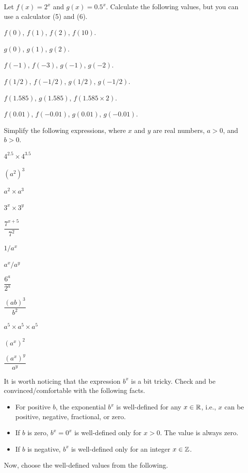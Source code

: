 \documentclass[11pt,pdfa,lastpage]{MishoNote}
\begin{document}
\begin{enumerate}
  \itemA Let $f(x)=2^x$ and $g(x)=0.5^x$.  Calculate the following values, but you can use a calculator  (5) and (6).
  \begin{menumerate}{2}
    \item $f(0)$, $f(1)$, $f(2)$, $f(10)$.
    \item $g(0)$, $g(1)$, $g(2)$.
    \item $f(-1)$, $f(-3)$, $g(-1)$, $g(-2)$.
    \item $f(1/2)$, $f(-1/2)$, $g(1/2)$, $g(-1/2)$.
    \item $f(1.585)$, $g(1.585)$, $f(1.585\times 2)$.
    \item $f(0.01)$, $f(-0.01)$, $g(0.01)$, $g(-0.01)$.
  \end{menumerate}
  \itemA Simplify the following expressions, where $x$ and $y$ are real numbers, $a>0$, and $b>0$.
  \begin{menumerate}{3}
    \item $4^{2.5}\times 4^{3.5}$
    \item $(a^2)^3$
    \item $a^2\times a^3$
    \item $3^{x}\times 3^{y}$
    \item $\dfrac{7^{x+5}}{7^{2}}$
    \item $1/a^x$
    \item $a^x/a^y$
    \item $\dfrac{6^a}{2^a}$
    \item $\dfrac{(ab)^3}{b^2}$
    \item $a^5\times a^5\times a^5$
    \item $(a^x)^2$
    \item $\dfrac{(a^x)^y}{a^y}$
  \end{menumerate}
  \itemC It is worth noticing that the expression $b^x$ is a bit tricky. Check and be convinced/comfortable with the following facts.
  \begin{itemize}
    \item For positive $b$, the exponential $b^x$ is well-defined for any $x\in{\mathbb{R}}$, i.e., $x$ can be positive, negative, fractional, or zero.
    \item If $b$ is zero, $b^x=0^x$ is well-defined only for $x>0$. The value is always zero.
    \item If $b$ is negative, $b^x$ is well-defined only for an integer $x\in{\mathbb{Z}}$.
  \end{itemize}
  Now, choose the well-defined values from the following.

\end{enumerate}
\end{document}
